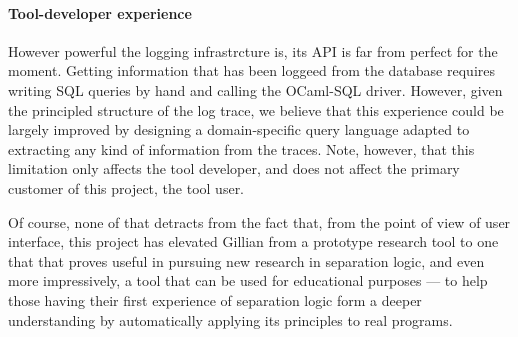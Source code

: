 \paragraph{Tool-developer experience} However powerful the logging infrastrcture
is, its API is far from perfect for the moment. Getting information that has
been loggeed from the database requires writing SQL queries by hand and calling
the OCaml-SQL driver. However, given the principled structure of the log trace,
we believe that this experience could be largely improved by designing a
domain-specific query language adapted to extracting any kind of information
from the traces. Note, however, that this limitation only affects the tool
developer, and does not affect the primary customer of this project, the tool
user.


Of course, none of that detracts from the fact that, from the point of view of
user interface, this project has elevated Gillian from a prototype research tool
to one that that proves useful in pursuing new research in separation logic,
and even more impressively, a tool that can be used for educational purposes ---
to help those having their first experience of separation logic form a deeper
understanding by automatically applying its principles to real programs.